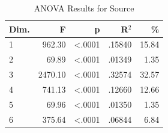 \begin{table}[H]
  \centering
  \caption{ANOVA Results for Source}
  \label{tab:anova_source}
  \begin{tabular}{l r r r r}
    Dim. & F & p & R$^2$ & \% \\
    \hline
    1 & 962.30 & <.0001 & .15840 & 15.84 \\
    2 & 69.89 & <.0001 & .01349 & 1.35 \\
    3 & 2470.10 & <.0001 & .32574 & 32.57 \\
    4 & 741.13 & <.0001 & .12660 & 12.66 \\
    5 & 69.96 & <.0001 & .01350 & 1.35 \\
    6 & 375.64 & <.0001 & .06844 & 6.84 \\
  \end{tabular}
\end{table}
